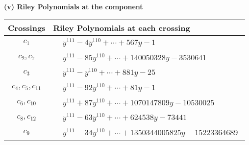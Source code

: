 \documentclass[1p]{elsarticle_modified}
\theoremstyle{definition}
\begin{document}
\newpage\renewcommand{\arraystretch}{1}
\flushleft \textbf{(v) Riley Polynomials at the component}\newline \\
\begin{tabular}{m{50pt}|m{274pt}}
Crossings & \hspace{64pt}Riley Polynomials at each crossing \\
\hline $$\begin{aligned}c_{1}\end{aligned}$$&$\begin{aligned}
&y^{111}-4 y^{110}+\cdots+567 y-1
\end{aligned}$\\
\hline $$\begin{aligned}c_{2},c_{7}\end{aligned}$$&$\begin{aligned}
&y^{111}-85 y^{110}+\cdots+140050328 y-3530641
\end{aligned}$\\
\hline $$\begin{aligned}c_{3}\end{aligned}$$&$\begin{aligned}
&y^{111}- y^{110}+\cdots+881 y-25
\end{aligned}$\\
\hline $$\begin{aligned}c_{4},c_{5},c_{11}\end{aligned}$$&$\begin{aligned}
&y^{111}-92 y^{110}+\cdots+81 y-1
\end{aligned}$\\
\hline $$\begin{aligned}c_{6},c_{10}\end{aligned}$$&$\begin{aligned}
&y^{111}+87 y^{110}+\cdots+1070147809 y-10530025
\end{aligned}$\\
\hline $$\begin{aligned}c_{8},c_{12}\end{aligned}$$&$\begin{aligned}
&y^{111}-63 y^{110}+\cdots+624538 y-73441
\end{aligned}$\\
\hline $$\begin{aligned}c_{9}\end{aligned}$$&$\begin{aligned}
&y^{111}-34 y^{110}+\cdots+1350344005825 y-15223364689
\end{aligned}$\\
\hline
\end{tabular}\\~\\
\end{document}
